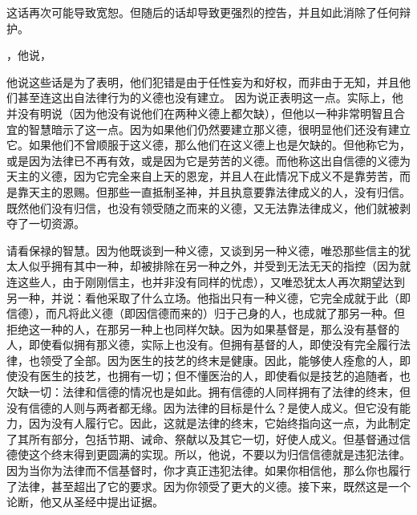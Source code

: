 这话再次可能导致宽恕。但随后的话却导致更强烈的控告，并且如此消除了任何辩护。\par

，他说，\par

他说这些话是为了表明，他们犯错是由于任性妄为和好权，而非由于无知，并且他们甚至连这出自法律行为的义德也没有建立。 因为说正表明这一点。实际上，他并没有明说（因为他没有说他们在两种义德上都欠缺），但他以一种非常明智且合宜的智慧暗示了这一点。因为如果他们仍然要建立那义德，很明显他们还没有建立它。如果他们不曾顺服于这义德，那么他们在这义德上也是欠缺的。但他称它为，或是因为法律已不再有效，或是因为它是劳苦的义德。而他称这出自信德的义德为天主的义德，因为它完全来自上天的恩宠，并且人在此情况下成义不是靠劳苦，而是靠天主的恩赐。但那些一直抵制圣神，并且执意要靠法律成义的人，没有归信。既然他们没有归信，也没有领受随之而来的义德，又无法靠法律成义，他们就被剥夺了一切资源。\par

 \par

请看保禄的智慧。因为他既谈到一种义德，又谈到另一种义德，唯恐那些信主的犹太人似乎拥有其中一种，却被排除在另一种之外，并受到无法无天的指控（因为就连这些人，由于刚刚信主，也并非没有同样的忧虑），又唯恐犹太人再次期望达到另一种，并说：看他采取了什么立场。他指出只有一种义德，它完全成就于此（即信德），而凡将此义德（即因信德而来的）归于己身的人，也成就了那另一种。但拒绝这一种的人，在那另一种上也同样欠缺。因为如果基督是，那么没有基督的人，即使看似拥有那义德，实际上也没有。但拥有基督的人，即使没有完全履行法律，也领受了全部。因为医生的技艺的终末是健康。因此，能够使人痊愈的人，即使没有医生的技艺，也拥有一切；但不懂医治的人，即使看似是技艺的追随者，也欠缺一切：法律和信德的情况也是如此。拥有信德的人同样拥有了法律的终末，但没有信德的人则与两者都无缘。因为法律的目标是什么？是使人成义。但它没有能力，因为没有人履行它。因此，这就是法律的终末，它始终指向这一点，为此制定了其所有部分，包括节期、诫命、祭献以及其它一切，好使人成义。但基督通过信德使这个终末得到更圆满的实现。所以，他说，不要以为归信信德就是违犯法律。因为当你为法律而不信基督时，你才真正违犯法律。如果你相信他，那么你也履行了法律，甚至超出了它的要求。因为你领受了更大的义德。接下来，既然这是一个论断，他又从圣经中提出证据。\par


